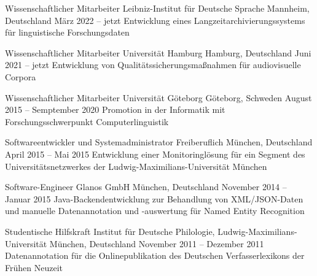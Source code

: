 \documentclass[11pt, a4]{academic-cv}
\begin{document}
\begin{cventries}
\cventry
{Wissenschaftlicher Mitarbeiter} %
{ Leibniz-Institut für Deutsche Sprache} %
{Mannheim, Deutschland} %
{März 2022 -- jetzt} %
{
Entwicklung eines Langzeitarchivierungssystems für linguistische Forschungsdaten
}

\cventry
{Wissenschaftlicher Mitarbeiter} %
{ Universität Hamburg} %
{Hamburg, Deutschland} %
{Juni 2021 -- jetzt} %
{
Entwicklung von Qualitätssicherungsmaßnahmen für audiovisuelle Corpora
}

\cventry
{Wissenschaftlicher Mitarbeiter} %
{ Universität Göteborg} %
{Göteborg, Schweden} %
{August 2015 -- Semptember 2020} %
{
Promotion in der Informatik mit Forschungsschwerpunkt Computerlinguistik
}

\cventry
{Softwareentwickler und Systemadministrator} %
{Freiberuflich} %
{München, Deutschland} %
{April 2015 -- Mai 2015} %
{
Entwicklung einer Monitoringlösung für ein Segment des Universitätsnetzwerkes der Ludwig-Maximilians-Universität München
}

\cventry
{Software-Engineer} %
{ Glanos GmbH} %
{München, Deutschland} %
{November 2014 -- Januar 2015} %
{
Java-Backendentwicklung zur Behandlung von XML/JSON-Daten und manuelle Datenannotation und -auswertung für Named Entity Recognition
}

\cventry
{Studentische Hilfskraft} %
{ Institut für Deutsche Philologie, Ludwig-Maximilians-Universität} %
{München, Deutschland} %
{November 2011 -- Dezember 2011} %
{
Datenannotation für die Onlinepublikation des Deutschen Verfasserlexikons der Frühen Neuzeit
}


\end{cventries}
\end{document}
